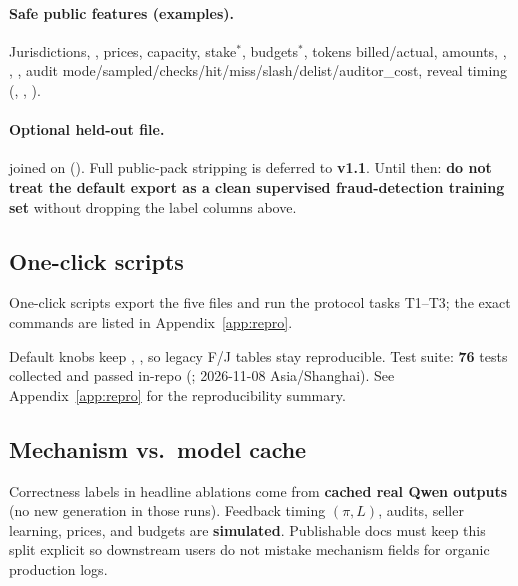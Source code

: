 \documentclass[sigconf,review]{acmart}
\begin{document}
\paragraph{Safe public features (examples).} Jurisdictions, , prices, capacity, stake$^{*}$, budgets$^{*}$, tokens billed/actual, amounts, , , , audit mode/sampled/checks/hit/miss/slash/delist/auditor\_cost, reveal timing (, , ).

\paragraph{Optional held-out file.}  joined on  (). Full public-pack stripping is deferred to \textbf{v1.1}. Until then: \textbf{do not treat the default export as a clean supervised fraud-detection training set} without dropping the label columns above.

\subsection{One-click scripts}
\label{sec:scripts}

One-click scripts export the five files and run the protocol tasks T1--T3; the exact commands are listed in Appendix~\ref{app:repro}.

Default knobs keep , ,  so legacy F/J tables stay reproducible. Test suite: \textbf{76} tests collected and passed in-repo (; 2026-11-08 Asia/Shanghai). See Appendix~\ref{app:repro} for the reproducibility summary.

\subsection{Mechanism vs.\ model cache}
\label{sec:cache}

Correctness labels in headline ablations come from \textbf{cached real Qwen outputs} (no new generation in those runs). Feedback timing $(\pi, L)$, audits, seller learning, prices, and budgets are \textbf{simulated}. Publishable docs must keep this split explicit so downstream users do not mistake mechanism fields for organic production logs.
\end{document}
